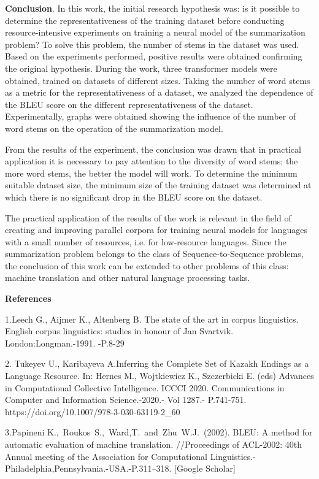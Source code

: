\textbf{Conclusion}. In this work, the initial research hypothesis was:
is it possible to determine the representativeness of the training
dataset before conducting resource-intensive experiments on training a
neural model of the summarization problem? To solve this problem, the
number of stems in the dataset was used. Based on the experiments
performed, positive results were obtained confirming the original
hypothesis. During the work, three transformer models were obtained,
trained on datasets of different sizes. Taking the number of word stems
as a metric for the representativeness of a dataset, we analyzed the
dependence of the BLEU score on the different representativeness of the
dataset. Experimentally, graphs were obtained showing the influence of
the number of word stems on the operation of the summarization model.

From the results of the experiment, the conclusion was drawn that in
practical application it is necessary to pay attention to the diversity
of word stems; the more word stems, the better the model will work. To
determine the minimum suitable dataset size, the minimum size of the
training dataset was determined at which there is no significant drop in
the BLEU score on the dataset.

The practical application of the results of the work is relevant in the
field of creating and improving parallel corpora for training neural
models for languages \hspace{0pt}\hspace{0pt}with a small number of
resources, i.e. for low-resource languages. Since the summarization
problem belongs to the class of Sequence-to-Sequence problems, the
conclusion of this work can be extended to other problems of this class:
machine translation and other natural language processing tasks.

\textbf{References}

1.Leech G., Aijmer K., Altenberg B. The state of the art in corpus
linguistics. English corpus linguistics: studies in honour of Jan
Svartvik. London:Longman.-1991. -P.8-29

2. Tukeyev U., Karibayeva A.Inferring the Complete Set of Kazakh Endings
as a Language Resource. In: Hernes M., Wojtkiewicz K., Szczerbicki E.
(eds) Advances in Computational Collective Intelligence. ICCCI 2020.
Communications in Computer and Information Science.-2020.- Vol 1287.-
P.741-751. https://doi.org/10.1007/978-3-030-63119-2\_60

3.Papineni K.,~Roukos~S.,~Ward,T.~and~Zhu~W.J.~(2002). BLEU: A method
for automatic evaluation of machine translation. //Proceedings of
ACL-2002: 40th Annual meeting of the Association for Computational
Linguistics.-Philadelphia,Pennsylvania.-USA.-P.311--318. {[}Google
Scholar{]}

